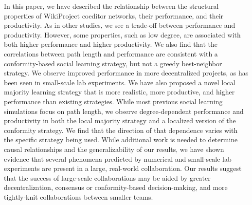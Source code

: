 In this paper, we have described the relationship between the structural properties of WikiProject
coeditor networks, their performance, and their productivity.
As in other studies, we see a trade-off between performance and productivity.
However, 
some properties, such as low degree, are associated with
both higher performance and higher productivity.
We also find that the correlations between path length and performance are consistent with a conformity-based
social learning strategy, but not a greedy best-neighbor strategy.
We observe improved performance in more decentralized projects,
as has been seen in small-scale lab experiments.
We have also proposed a novel local majority learning strategy that is more realistic,
more productive, and higher performance than existing strategies.
While most previous social learning simulations focus on path length,
we observe degree-dependent performance and productivity
in both the local majority strategy
and a localized version of the conformity strategy.
We find that the direction of that dependence varies with the
specific strategy being used.
While additional work is needed to determine causal relationships
and the generalizability of our results,
we have shown evidence that several phenomena predicted by numerical
and small-scale lab experiments are present in a large,
real-world collaboration.
Our results suggest that the success of large-scale collaborations may be aided
by greater decentralization,
consensus or conformity-based decision-making,
and more tightly-knit collaborations between smaller teams.

